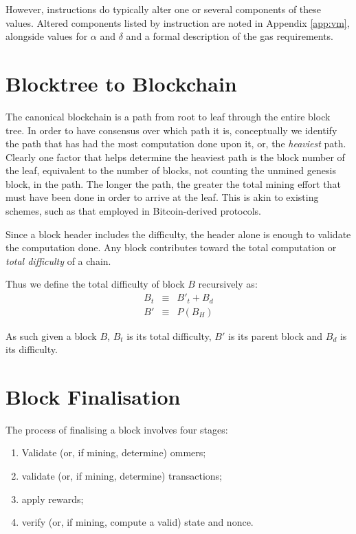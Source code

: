 \documentclass[9pt,oneside]{amsart}
\begin{document}
\begin{multicols}{2}
However, instructions do typically alter one or several components of these values. Altered components listed by instruction are noted in Appendix \ref{app:vm}, alongside values for $\alpha$ and $\delta$ and a formal description of the gas requirements.

\section{Blocktree to Blockchain} \label{ch:ghost}

The canonical blockchain is a path from root to leaf through the entire block tree. In order to have consensus over which path it is, conceptually we identify the path that has had the most computation done upon it, or, the \textit{heaviest} path. Clearly one factor that helps determine the heaviest path is the block number of the leaf, equivalent to the number of blocks, not counting the unmined genesis block, in the path. The longer the path, the greater the total mining effort that must have been done in order to arrive at the leaf. This is akin to existing schemes, such as that employed in Bitcoin-derived protocols.

Since a block header includes the difficulty, the header alone is enough to validate the computation done. Any block contributes toward the total computation or \textit{total difficulty} of a chain.

Thus we define the total difficulty of block $B$ recursively as:
\begin{eqnarray}
B_t & \equiv & B'_t + B_d \\
B' & \equiv & P(B_H)
\end{eqnarray}

As such given a block $B$, $B_t$ is its total difficulty, $B'$ is its parent block and $B_d$ is its difficulty.

\section{Block Finalisation} \label{ch:finalisation}

The process of finalising a block involves four stages:

\begin{enumerate}
\item Validate (or, if mining, determine) ommers;
\item validate (or, if mining, determine) transactions;
\item apply rewards;
\item verify (or, if mining, compute a valid) state and nonce.
\end{enumerate}


\end{multicols}
\end{document}
